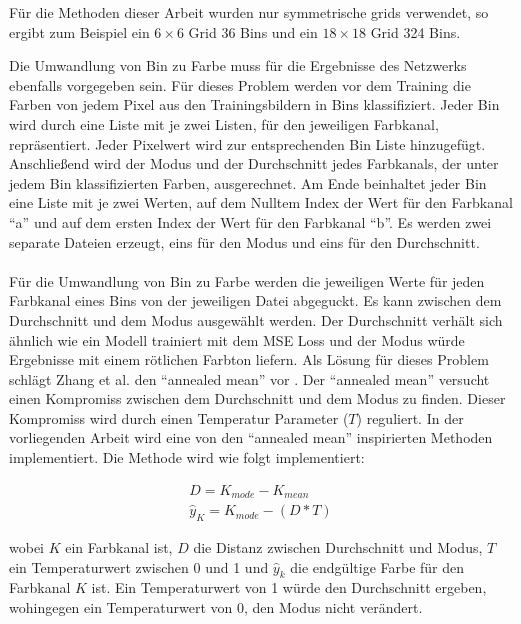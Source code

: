 Für die Methoden dieser Arbeit wurden nur symmetrische \gls{grid}s verwendet, so ergibt zum Beispiel ein $6 \times 6$ Grid 36 Bins und
ein $18 \times 18$ Grid 324 Bins.

Die Umwandlung von Bin zu Farbe muss für die Ergebnisse des Netzwerks ebenfalls vorgegeben sein. Für dieses Problem werden vor dem
Training die Farben von jedem Pixel aus den Trainingsbildern in Bins klassifiziert. Jeder Bin wird durch eine Liste mit je zwei Listen,
für den jeweiligen Farbkanal, repräsentiert. Jeder Pixelwert wird zur entsprechenden Bin Liste hinzugefügt. Anschließend wird der Modus
und der Durchschnitt jedes Farbkanals, der unter jedem Bin klassifizierten Farben, ausgerechnet. Am Ende beinhaltet jeder Bin eine Liste mit je zwei
Werten, auf dem Nulltem Index der Wert für den Farbkanal ``a'' und auf dem ersten Index der Wert für den Farbkanal ``b''. Es werden zwei separate
Dateien erzeugt, eins für den Modus und eins für den Durchschnitt.
\\
\\
Für die Umwandlung von Bin zu Farbe werden die jeweiligen Werte für jeden Farbkanal eines Bins von der jeweiligen Datei abgeguckt. Es kann zwischen
dem Durchschnitt und dem Modus ausgewählt werden. Der Durchschnitt verhält sich ähnlich wie ein Modell trainiert mit dem MSE Loss und der Modus
würde Ergebnisse mit einem rötlichen Farbton liefern. Als Lösung für dieses Problem schlägt Zhang et al. den ``annealed mean'' vor \cite{zhang2016colorful}.
Der ``annealed mean'' versucht einen Kompromiss zwischen dem Durchschnitt und dem Modus zu finden. Dieser Kompromiss wird durch einen
Temperatur Parameter ($T$) reguliert. In der vorliegenden Arbeit wird eine von den ``annealed mean'' inspirierten Methoden implementiert.
Die Methode wird wie folgt implementiert:

\begin{equation}
  \begin{gathered}
    D = K_{mode} - K_{mean} \\
    \hat{y}_{K} = K_{mode} - (D * T)
  \end{gathered}
\end{equation}

wobei $K$ ein Farbkanal ist, $D$ die Distanz zwischen Durchschnitt und Modus, $T$ ein Temperaturwert zwischen 0 und 1 und $\hat{y}_{k}$ die
endgültige Farbe für den Farbkanal $K$ ist.
Ein Temperaturwert von 1 würde den Durchschnitt ergeben, wohingegen ein Temperaturwert von 0, den Modus nicht verändert.

